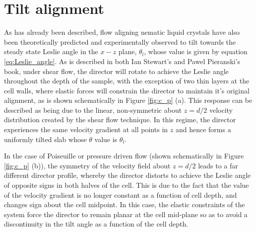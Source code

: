 \section{Tilt alignment}
\label{sec:tilt_alignment}
As has already been described, flow aligning nematic liquid crystals have also been theoretically predicted and experimentally observed to tilt towards the steady state Leslie angle in the $x-z$ plane, $\theta_l$, whose value is given by equation \ref{eq:Leslie_angle}. As is described in both Ian Stewart's \cite{Stewart2004} and Pawel Pieranski's \cite{Pieranski2005} book, under shear flow, the director will rotate to achieve the Leslie angle throughout the depth of the sample, with the exception of two thin layers at the cell walls, where elastic forces will constrain the director to maintain it's original alignment, as is shown schematically in Figure \ref{fig:c_p} (a). This response can be described as being due to the linear, non-symmetric about $z=d/2$ velocity distribution created by the shear flow technique. In this regime, the director experiences the same velocity gradient at all points in $z$ and hence forms a uniformly tilted slab whose $\theta$ value is $\theta_l$.

In the case of Poiseuille or pressure driven flow (shown schematically in Figure \ref{fig:c_p} (b)), the symmetry of the velocity field about $z=d/2$ leads to a far different director profile, whereby the director distorts to achieve the Leslie angle of opposite signs in both halves of the cell. This is due to the fact that the value of the velocity gradient is no longer constant as a function of cell depth, and changes sign about the cell midpoint. In this case, the elastic constraints of the system force the director to remain planar at the cell mid-plane so as to avoid a discontinuity in the tilt angle as a function of the cell depth.

